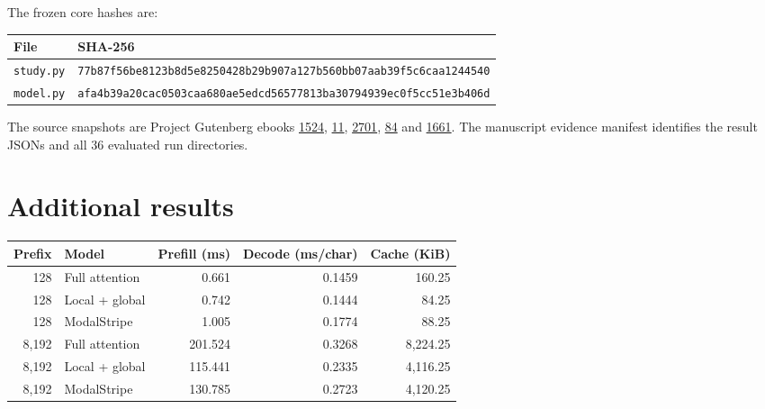 \documentclass[11pt,letterpaper]{article}
\begin{document}
The frozen core hashes are:
\begin{center}\small
\begin{tabular}{ll}\toprule File & SHA-256\\\midrule
\texttt{study.py} & \texttt{\scriptsize 77b87f56be8123b8d5e8250428b29b907a127b560bb07aab39f5c6caa1244540}\\
\texttt{model.py} & \texttt{\scriptsize afa4b39a20cac0503caa680ae5edcd56577813ba30794939ec0f5cc51e3b406d}\\\bottomrule
\end{tabular}\end{center}
The source snapshots are Project Gutenberg ebooks \href{https://www.gutenberg.org/ebooks/1524}{1524}, \href{https://www.gutenberg.org/ebooks/11}{11}, \href{https://www.gutenberg.org/ebooks/2701}{2701}, \href{https://www.gutenberg.org/ebooks/84}{84} and \href{https://www.gutenberg.org/ebooks/1661}{1661}. The manuscript evidence manifest identifies the result JSONs and all 36 evaluated run directories.

\section{Additional results}\label{app:results}


\begin{center}\begin{minipage}{\textwidth}\centering\small
{}
\label{tab:timing}

\begin{tabular}{rlrrr}\toprule
Prefix & Model & Prefill (ms) & Decode (ms/char) & Cache (KiB)\\\midrule
128 & Full attention & 0.661 & 0.1459 & 160.25 \\
128 & Local + global & 0.742 & 0.1444 & 84.25 \\
128 & ModalStripe & 1.005 & 0.1774 & 88.25 \\
8,192 & Full attention & 201.524 & 0.3268 & 8,224.25 \\
8,192 & Local + global & 115.441 & 0.2335 & 4,116.25 \\
8,192 & ModalStripe & 130.785 & 0.2723 & 4,120.25 \\
\bottomrule\end{tabular}


\end{minipage}\end{center}
\end{document}
